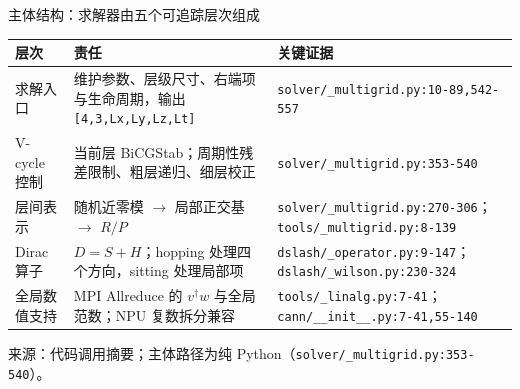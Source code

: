 \documentclass[UTF8,aspectratio=169,11pt]{ctexbeamer}
\newcommand{\source}[1]{%
  \vspace{0.06em}\par{\raggedright\scriptsize\color{muted}来源：#1\par}}
\newcommand{\pathref}[1]{\nolinkurl{#1}}
\begin{document}
\begin{frame}[t]{主体结构：求解器由五个可追踪层次组成}
  \begin{center}
    \tiny
    \begin{tabular}{@{}P{0.20\textwidth}P{0.55\textwidth}P{0.18\textwidth}@{}}
      \toprule
      层次 & 责任 & 关键证据 \\
      \midrule
      求解入口 & 维护参数、层级尺寸、右端项与生命周期，输出 \texttt{[4,3,Lx,Ly,Lz,Lt]} & \pathref{solver/_multigrid.py:10-89,542-557} \\
      V-cycle 控制 & 当前层 BiCGStab；周期性残差限制、粗层递归、细层校正 & \pathref{solver/_multigrid.py:353-540} \\
      层间表示 & 随机近零模 $\rightarrow$ 局部正交基 $\rightarrow$ $R/P$ & \pathref{solver/_multigrid.py:270-306}；\pathref{tools/_multigrid.py:8-139} \\
      Dirac 算子 & $D=S+H$；hopping 处理四个方向，sitting 处理局部项 & \pathref{dslash/_operator.py:9-147}；\pathref{dslash/_wilson.py:230-324} \\
      全局数值支持 & MPI Allreduce 的 $v^\dagger w$ 与全局范数；NPU 复数拆分兼容 & \pathref{tools/_linalg.py:7-41}；\pathref{cann/__init__.py:7-41,55-140} \\
      \bottomrule
    \end{tabular}
  \end{center}
  \vspace{0em}
  \source{代码调用摘要；主体路径为纯 Python（\pathref{solver/_multigrid.py:353-540}）。}
\end{frame}
\end{document}
